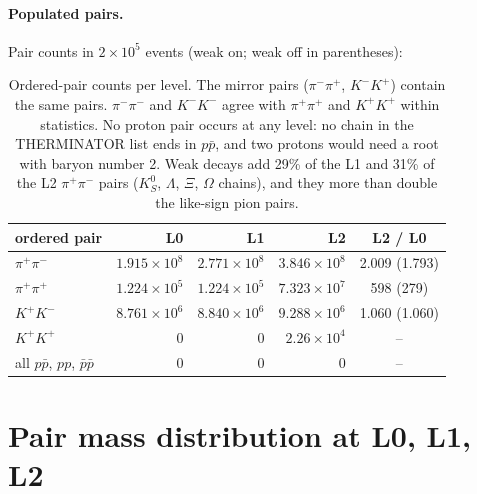\documentclass[11pt,a4paper]{article}
\begin{document}
\paragraph{Populated pairs.} Pair counts in $2\times10^5$ events (weak on; weak off in parentheses):

\begin{table}[H]
\centering\small
\begin{tabular}{lrrrc}
\toprule
ordered pair & L0 & L1 & L2 & L2 / L0 \\
\midrule
$\pi^+\pi^-$ & $1.915\times10^8$ & $2.771\times10^8$ & $3.846\times10^8$ & 2.009 (1.793) \\
$\pi^+\pi^+$ & $1.224\times10^5$ & $1.224\times10^5$ & $7.323\times10^7$ & 598 (279) \\
$K^+K^-$     & $8.761\times10^6$ & $8.840\times10^6$ & $9.288\times10^6$ & 1.060 (1.060) \\
$K^+K^+$     & 0 & 0 & $2.26\times10^4$ & -- \\
all $p\bar p$, $pp$, $\bar p\bar p$ & 0 & 0 & 0 & -- \\
\bottomrule
\end{tabular}
\caption{Ordered-pair counts per level. The mirror pairs ($\pi^-\pi^+$, $K^-K^+$) contain the same pairs.
$\pi^-\pi^-$ and $K^-K^-$ agree with $\pi^+\pi^+$ and $K^+K^+$ within statistics. No proton
pair occurs at any level: no chain in the THERMINATOR list ends in $p\bar p$, and two protons
would need a root with baryon number 2. Weak decays add 29\% of the L1 and 31\% of the L2
$\pi^+\pi^-$ pairs ($K^0_S$, $\Lambda$, $\Xi$, $\Omega$ chains), and they more than double the
like-sign pion pairs.}
\label{tab:counts}
\end{table}

\section{Pair mass distribution at L0, L1, L2}
\end{document}
